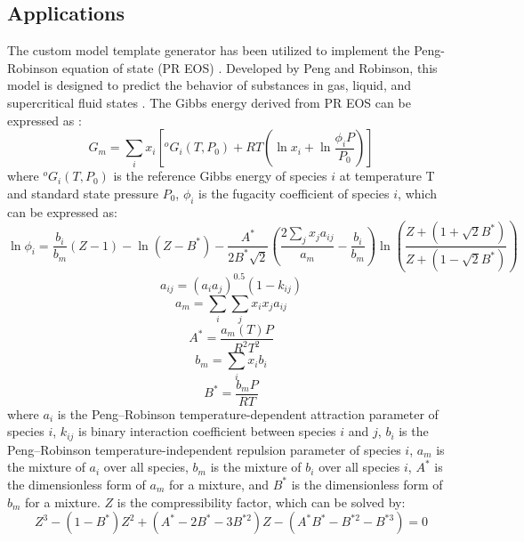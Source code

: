 \subsection{Applications} \label{models:ssec:CMTGapp}
The custom model template generator has been utilized to implement the Peng-Robinson equation of state (PR EOS) \cite{peng1976new}. Developed by Peng and Robinson, this model is designed to predict the behavior of substances in gas, liquid, and supercritical fluid states \cite{peng1976new}. The Gibbs energy derived from PR EOS can be expressed as \cite{tang2005supercritical}:
\begin{equation} \label{models:eq:PRGm}
    G_m=\sum_i{x_i\left[^{o}G_i(T, P_0)+RT\left(\ln{x_i}+\ln{\frac{\phi_iP}{P_0}}\right)\right]}
\end{equation}
where $^{o}G_i(T, P_0)$ is the reference Gibbs energy of species $i$ at temperature T and standard state pressure $P_0$, $\phi_i$ is the fugacity coefficient of species $i$, which can be expressed as:
\begin{equation} \label{models:eq:PRphi}
    \ln{\phi_i}=\frac{b_i}{b_m}(Z-1)-\ln{(Z-B^*)}-\frac{A^*}{2B^*\sqrt{2}}\left(\frac{2\sum_jx_ja_{ij}}{a_m}-\frac{b_i}{b_m}\right)\ln{\left(\frac{Z+(1+\sqrt{2}B^*)}{Z+(1-\sqrt{2}B^*)}\right)}
\end{equation}
\begin{equation} \label{models:eq:PRaij}
    a_{ij}=(a_ia_j)^{0.5}(1-k_{ij})
\end{equation}
\begin{equation} \label{models:eq:PRam}
    a_m=\sum_i\sum_jx_ix_ja_{ij}
\end{equation} 
\begin{equation} \label{models:eq:PRAs}
    A^*=\frac{a_m(T)P}{R^2T^2}
\end{equation}
\begin{equation} \label{models:eq:PRbm}
    b_m=\sum_ix_ib_i
\end{equation} 
\begin{equation} \label{models:eq:PRBs}
    B^*=\frac{b_mP}{RT}
\end{equation}
where $a_i$ is the Peng–Robinson temperature-dependent attraction parameter of species $i$, $k_{ij}$ is binary interaction coefficient between species $i$ and $j$, $b_i$ is the Peng–Robinson temperature-independent repulsion parameter of species $i$, $a_m$ is the mixture of $a_i$ over all species, $b_m$ is the mixture of $b_i$ over all species $i$, $A^*$ is the dimensionless form of $a_m$ for a mixture, and $B^*$ is the dimensionless form of $b_m$ for a mixture. $Z$ is the compressibility factor, which can be solved by:
\begin{equation} \label{models:eq:PRZ}
    Z^3-(1-B^*)Z^2+(A^*-2B^*-3B^{*2})Z-(A^*B^*-B^{*2}-B^{*3})=0
\end{equation}

